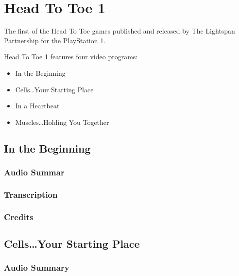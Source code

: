 \chapter{Head To Toe 1}


The first of the Head To Toe games published and released by The Lightspan Partnership for the PlayStation 1.

Head To Toe 1 features four video programs:

\begin{itemize}
    \item In the Beginning
    \item Cells\dots Your Starting Place
    \item In a Heartbeat
    \item Muscles\dots Holding You Together
\end{itemize}

\clearpage
\newpage

\section{In the Beginning}

\subsection{Audio Summar}

\subsection{Transcription}

\subsection{Credits}

\section{Cells\dots Your Starting Place}

\subsection{Audio Summary}

